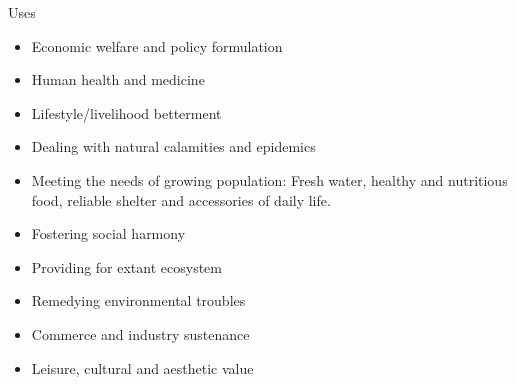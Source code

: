 \documentclass[
  ignorenonframetext,
  aspectratio=169]{beamer}
\providecommand{\tightlist}{%
  \setlength{\itemsep}{0pt}\setlength{\parskip}{0pt}}
\begin{document}
\begin{frame}{Uses}
\protect\hypertarget{uses}{}
\begin{itemize}
\tightlist
\item
  Economic welfare and policy formulation
\item
  Human health and medicine
\item
  Lifestyle/livelihood betterment
\item
  Dealing with natural calamities and epidemics
\item
  Meeting the needs of growing population: Fresh water, healthy and
  nutritious food, reliable shelter and accessories of daily life.
\item
  Fostering social harmony
\item
  Providing for extant ecosystem
\item
  Remedying environmental troubles
\item
  Commerce and industry sustenance
\item
  Leisure, cultural and aesthetic value
\end{itemize}
\end{frame}
\end{document}
